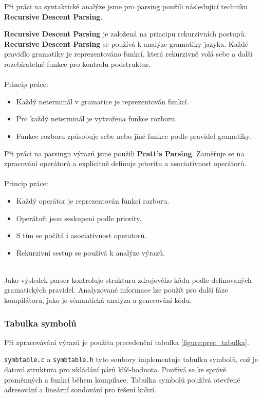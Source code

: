 \documentclass[a4paper, 11pt]{article}
\begin{document}
    Při práci na syntaktické analýze jsme pro parsing použili následující techniku \textbf{Recursive Descent Parsing}.
    
    \textbf{Recursive Descent Parsing} je založená na principu rekurzivních postupů. \textbf{Recursive Descent Parsing} se používá k analýze gramatiky jazyka. Každé pravidlo gramatiky je reprezentováno funkcí, která rekurzivně volá sebe a další rozebíratelné funkce pro kontrolu podstruktur.
    \\
    \\
    Princip práce:
    \begin{itemize}
        \item Každý neterminál v gramatice je reprezentován funkcí.
        \item Pro každý neterminál je vytvořena funkce rozboru.
        \item Funkce rozboru způsobuje sebe nebo jiné funkce podle pravidel gramatiky.
    \end{itemize}

    Při práci na parsingu výrazů jsme použili \textbf{Pratt's Parsing}.
    Zaměřuje se na zpracování operátorů a explicitně definuje prioritu a asociativnost operátorů.
    \\
    \\
    Princip práce:
    \begin{itemize}
        \item Každý operátor je reprezentován funkcí rozboru.
        \item Operátoři jsou seskupeni podle priority.
        \item S tím se počítá i asociativnost operatorů.
        \item Rekurzivní sestup se používá k analýze výrazů.
    \end{itemize}

    \\
    Jako výsledek parser kontroluje strukturu zdrojového kódu podle definovaných gramatických pravidel.
    Analyzované informace lze použít pro další fáze kompilátoru, jako je sémantická analýza a generování kódu.

	
	\subsubsection{Tabulka symbolů}

	Při zpracovávání výrazů je použita precedenční tabulka \ref{figure:prec_tabulka}. 

        \verb|symbtable.c| a \verb|symbtable.h| tyto soubory implementuje tabulku symbolů, což je datová struktura pro ukládání párů klíč-hodnota. Používá se ke správě proměnných a funkcí během kompilace. Tabulka symbolů používá otevřené adresování a lineární sondování pro řešení kolizí.
\end{document}
